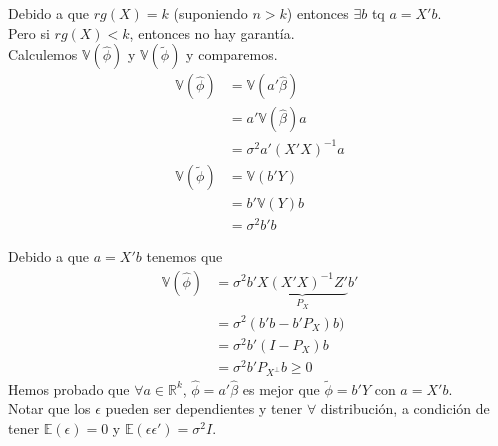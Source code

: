 \documentclass[10pt]{article}
\theoremstyle{plain}
\theoremstyle{definition}
\begin{document}
Debido a que $rg(X) = k$ (suponiendo $n>k$) entonces $\exists b$ tq $a=X'b$.\\

Pero si $rg(X) < k$, entonces no hay garantía.\\

Calculemos $\mathbb{V}(\hat{\phi})$ y $\mathbb{V}(\tilde{\phi})$ y comparemos.
\begin{align*}
\mathbb{V}(\hat{\phi}) &= \mathbb{V}(a'\hat{\beta})\\
&= a'\mathbb{V}(\hat{\beta})a\\
&= \sigma^2 a'(X'X)^{-1} a\\
\mathbb{V}(\tilde{\phi}) &= \mathbb{V}(b'Y)\\
&= b' \mathbb{V}(Y)b\\
&= \sigma^2 b'b
\end{align*}

Debido a que $a = X'b$ tenemos que 
\begin{align*}
\mathbb{V}(\hat{\phi}) &= \sigma^2 b'\underbrace{X(X'X)^{-1}Z'}_{P_{X}}b'\\
&= \sigma^2 (b'b - b'P_{X})b)\\
&= \sigma^2b'(I-P_{X})b\\
&= \sigma^2 b'P_{X^{\perp}}b \ge 0
\end{align*}
Hemos probado que $\forall a \in \mathbb{R}^{k}$, $\hat{\phi}= a' \hat{\beta}$ es mejor que $\tilde{\phi}= b'Y$ con $a=X'b$.\\

Notar que los $\epsilon$ pueden ser dependientes y tener $\forall$ distribución, a condición de tener $\mathbb{E}(\epsilon)= 0$ y $\mathbb{E}(\epsilon\epsilon') = \sigma^2I$.
\end{document}
